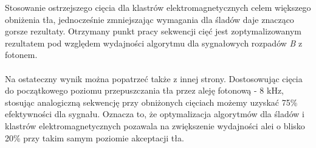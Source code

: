 \documentclass{pracamgr}
\begin{document}
\noindent
Stosowanie ostrzejszego cięcia dla klastrów elektromagnetycznych celem większego obniżenia tła, jednocześnie zmniejszając wymagania dla śladów daje znacząco gorsze rezultaty. Otrzymany punkt pracy sekwencji cięć jest zoptymalizowanym rezultatem pod względem wydajności algorytmu dla sygnałowych rozpadów \textit{B} z fotonem.
\\\\
\noindent
Na ostateczny wynik można popatrzeć także z innej strony. Dostosowując cięcia do początkowego poziomu przepuszczania tła przez aleję fotonową - 8 kHz, stosując analogiczną sekwencję przy obniżonych cięciach możemy uzyskać 75\% efektywności dla sygnału. Oznacza to, że optymalizacja algorytmów dla śladów i klastrów elektromagnetycznych pozawala na zwiększenie wydajności alei o blisko 20\% przy takim samym poziomie akceptacji tła.
\end{document}
